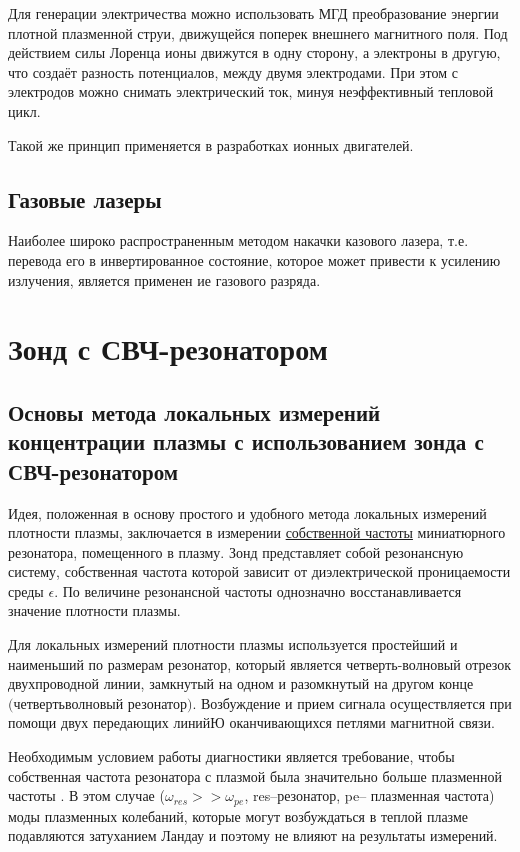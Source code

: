 Для генерации электричества можно использовать МГД преобразование энергии плотной плазменной струи, движущейся поперек внешнего магнитного поля. Под действием силы Лоренца ионы движутся в одну сторону, а электроны в другую, что создаёт разность потенциалов, между двумя электродами. При этом с электродов можно снимать электрический ток, минуя неэффективный тепловой цикл.

Такой же принцип применяется в разработках ионных двигателей.

\subsection{Газовые лазеры}

Наиболее широко распространенным методом накачки казового лазера, т.е. перевода его в инвертированное состояние, которое может привести к усилению излучения, является применен
ие газового разряда.
\section{Зонд с СВЧ-резонатором} %
\subsection{Основы метода локальных измерений концентрации плазмы с использованием зонда с СВЧ-резонатором}
Идея, положенная в основу простого и удобного метода локальных измерений плотности плазмы, заключается в измерении \underline{собственной частоты}
миниатюрного резонатора, помещенного в плазму. Зонд представляет собой резонансную систему, собственная частота которой зависит от диэлектрической проницаемости среды $\epsilon$. По величине резонансной частоты однозначно восстанавливается значение плотности плазмы.

Для локальных измерений плотности плазмы используется простейший и наименьший по размерам резонатор, который является четверть-волновый отрезок двухпроводной линии, замкнутый на одном и разомкнутый на другом конце  $\hyperref[def:1]{\text{(четвертьволновый резонатор)}}$. Возбуждение и прием сигнала осуществляется при помощи двух передающих линийЮ оканчивающихся петлями магнитной связи.

Необходимым условием работы диагностики является требование, чтобы собственная частота резонатора с плазмой была значительно больше плазменной частоты . В этом случае ($\omega_{res}>>\omega_{pe}$, res--резонатор, pe-- плазменная частота) моды плазменных колебаний, которые могут возбуждаться в теплой плазме подавляются затуханием Ландау и поэтому не влияют на результаты измерений.

